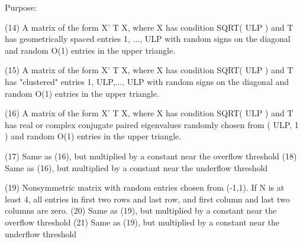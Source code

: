 \begin{DoxyParagraph}{Purpose\+: }
\begin{DoxyVerb}
    (14) A matrix of the form  X' T X, where X has condition
         SQRT( ULP ) and T has geometrically spaced entries
         1, ..., ULP with random signs on the diagonal and random
         O(1) entries in the upper triangle.

    (15) A matrix of the form  X' T X, where X has condition
         SQRT( ULP ) and T has "clustered" entries 1, ULP,..., ULP
         with random signs on the diagonal and random O(1) entries
         in the upper triangle.

    (16) A matrix of the form  X' T X, where X has condition
         SQRT( ULP ) and T has real or complex conjugate paired
         eigenvalues randomly chosen from ( ULP, 1 ) and random
         O(1) entries in the upper triangle.

    (17) Same as (16), but multiplied by a constant
         near the overflow threshold
    (18) Same as (16), but multiplied by a constant
         near the underflow threshold

    (19) Nonsymmetric matrix with random entries chosen from (-1,1).
         If N is at least 4, all entries in first two rows and last
         row, and first column and last two columns are zero.
    (20) Same as (19), but multiplied by a constant
         near the overflow threshold
    (21) Same as (19), but multiplied by a constant
         near the underflow threshold\end{DoxyVerb}
 
\end{DoxyParagraph}

